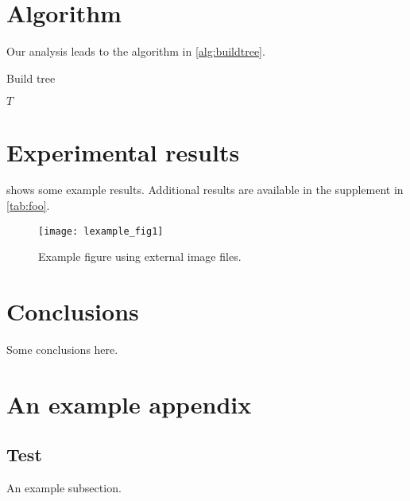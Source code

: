 \documentclass[review]{siamart}
\begin{document}
\section{Algorithm}
\label{sec:alg}

\lipsum[40]

Our analysis leads to the algorithm in \cref{alg:buildtree}.

\begin{algorithm}
\caption{Build tree}
\label{alg:buildtree}
\begin{algorithmic}
\ENDWHILE
\RETURN $T$
\end{algorithmic}
\end{algorithm}

\lipsum[41]

\section{Experimental results}
\label{sec:experiments}

\lipsum[50]

 shows some example results. Additional results are
available in the supplement in \cref{tab:foo}.

\begin{figure}[htbp]
  \centering
  \label{fig:a}\texttt{[image: lexample\_fig1]}
  \caption{Example figure using external image files.}
  \label{fig:testfig}
\end{figure}

\lipsum[51]

\section{Conclusions}
\label{sec:conclusions}

Some conclusions here.


\appendix
\section{An example appendix}
\lipsum[70]

\subsection{Test}
An example subsection.
\end{document}
